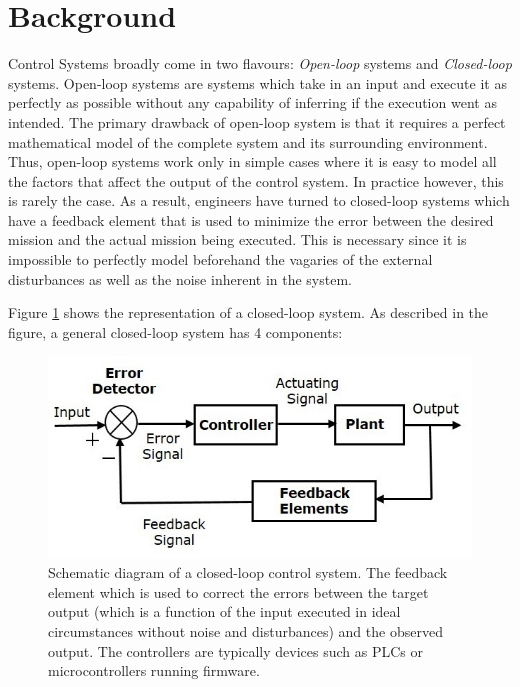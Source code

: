  \section{Background}
Control Systems broadly come in two flavours: \textit{Open-loop} systems and \textit{Closed-loop} systems. Open-loop systems are systems which take in an input and execute it as perfectly as possible without any capability of inferring if the execution went as intended. The primary drawback of open-loop system is that it requires a perfect mathematical model of the complete system and its surrounding environment. Thus, open-loop systems work only in simple cases where it is easy to model all the factors that affect the output of the control system. In practice however, this is rarely the case. As a result, engineers have turned to closed-loop systems which have a feedback element that is used to minimize the error between the desired mission and the actual mission being executed. This is necessary since it is impossible to perfectly model beforehand the vagaries of the external disturbances as well as the noise inherent in the system.

Figure \ref{fig:control system} shows the representation of a closed-loop system. As described in the figure, a general closed-loop system has 4 components:


\begin{figure}
    \includegraphics[scale=0.40]{images/closed_loop.jpg}
    \caption{Schematic diagram of a closed-loop control system. The feedback element which is used to correct the errors between the target output (which is a function of the input executed in ideal circumstances without noise and disturbances) and the observed output. The controllers are typically devices such as PLCs or microcontrollers running firmware.}
    \label{fig:control system}
\end{figure}


